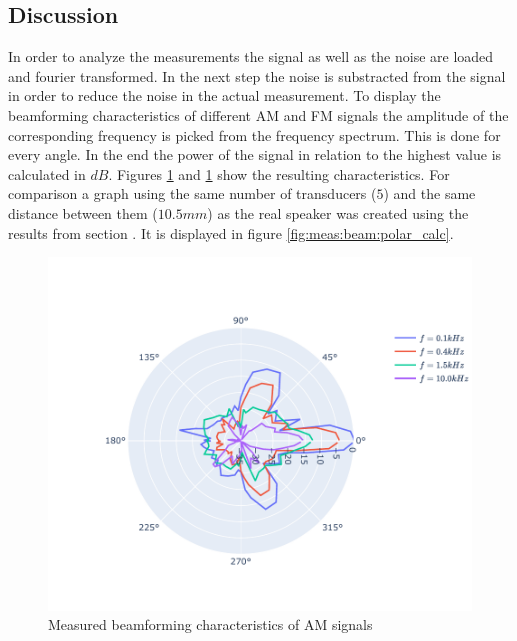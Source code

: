 \subsection{Discussion}
%
In order to analyze the measurements the signal as well as the noise are loaded and fourier transformed. In the next step the noise is substracted from the signal in order to reduce the noise in the actual measurement.\enlargethispage{\baselineskip}\p
To display the beamforming characteristics of different AM and FM signals the amplitude of the corresponding frequency is picked from the frequency spectrum. This is done for every angle. In the end the power of the signal in relation to the highest value is calculated in $dB$. Figures \ref{fig:meas:beam:polar_meas_am} and \ref{fig:meas:beam:polar_meas_am} show the resulting characteristics.\p
For comparison a graph using the same number of transducers ($5$) and the same distance between them ($10.5mm$) as the real speaker was created using the results from section . It is displayed in figure \ref{fig:meas:beam:polar_calc}.
%
\begin{figure}
  \centering
  \includegraphics[height=\largeheight]{src/assets/pictures/measurements/beamforming_am_polar.pdf}
  \caption{Measured beamforming characteristics of AM signals}\label{fig:meas:beam:polar_meas_am}
\end{figure}
%
